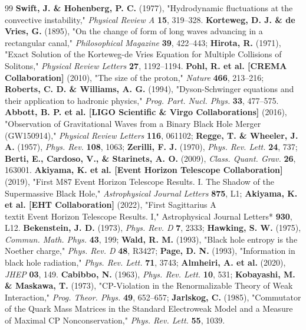 \documentclass[10pt,a4paper]{article}
\begin{document}
\begin{thebibliography}{99}
 \textbf{Swift, J. \& Hohenberg, P. C.} (1977), "Hydrodynamic fluctuations at the convective instability," \textit{Physical Review A} \textbf{15}, 319–328.
 \textbf{Korteweg, D. J. \& de Vries, G.} (1895), "On the change of form of long waves advancing in a rectangular canal," \textit{Philosophical Magazine} \textbf{39}, 422–443; \textbf{Hirota, R.} (1971), "Exact Solution of the Korteweg-de Vries Equation for Multiple Collisions of Solitons," \textit{Physical Review Letters} \textbf{27}, 1192–1194.
 \textbf{Pohl, R. et al. [CREMA Collaboration]} (2010), "The size of the proton," \textit{Nature} \textbf{466}, 213–216; \textbf{Roberts, C. D. \& Williams, A. G.} (1994), "Dyson-Schwinger equations and their application to hadronic physics," \textit{Prog. Part. Nucl. Phys.} \textbf{33}, 477–575.
 \textbf{Abbott, B. P. et al. [LIGO Scientific \& Virgo Collaborations]} (2016), "Observation of Gravitational Waves from a Binary Black Hole Merger (GW150914)," \textit{Physical Review Letters} \textbf{116}, 061102; \textbf{Regge, T. \& Wheeler, J. A.} (1957), \textit{Phys. Rev.} \textbf{108}, 1063; \textbf{Zerilli, F. J.} (1970), \textit{Phys. Rev. Lett.} \textbf{24}, 737; \textbf{Berti, E., Cardoso, V., \& Starinets, A. O.} (2009), \textit{Class. Quant. Grav.} \textbf{26}, 163001.
 \textbf{Akiyama, K. et al. [Event Horizon Telescope Collaboration]} (2019), "First M87 Event Horizon Telescope Results. I. The Shadow of the Supermassive Black Hole," \textit{Astrophysical Journal Letters} \textbf{875}, L1; \textbf{Akiyama, K. et al. [EHT Collaboration]} (2022), "First Sagittarius A\\textit{ Event Horizon Telescope Results. I," }Astrophysical Journal Letters* \textbf{930}, L12.
 \textbf{Bekenstein, J. D.} (1973), \textit{Phys. Rev. D} \textbf{7}, 2333; \textbf{Hawking, S. W.} (1975), \textit{Commun. Math. Phys.} \textbf{43}, 199; \textbf{Wald, R. M.} (1993), "Black hole entropy is the Noether charge," \textit{Phys. Rev. D} \textbf{48}, R3427; \textbf{Page, D. N.} (1993), "Information in black hole radiation," \textit{Phys. Rev. Lett.} \textbf{71}, 3743; \textbf{Almheiri, A. et al.} (2020), \textit{JHEP} \textbf{03}, 149.
 \textbf{Cabibbo, N.} (1963), \textit{Phys. Rev. Lett.} \textbf{10}, 531; \textbf{Kobayashi, M. \& Maskawa, T.} (1973), "CP-Violation in the Renormalizable Theory of Weak Interaction," \textit{Prog. Theor. Phys.} \textbf{49}, 652–657; \textbf{Jarlskog, C.} (1985), "Commutator of the Quark Mass Matrices in the Standard Electroweak Model and a Measure of Maximal CP Nonconservation," \textit{Phys. Rev. Lett.} \textbf{55}, 1039.

\end{thebibliography}
\end{document}
